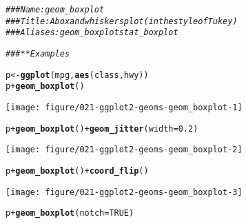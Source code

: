 \documentclass[a4paper,titlepage]{tufte-handout}\usepackage[]{graphicx}\usepackage[]{color}
\makeatletter
\def\maxwidth{ %
  \ifdim\Gin@nat@width>\linewidth
    \linewidth
  \else
    \Gin@nat@width
  \fi
}
\newcommand{\hlnum}[1]{\textcolor[rgb]{0.686,0.059,0.569}{#1}}%
\newcommand{\hlcom}[1]{\textcolor[rgb]{0.678,0.584,0.686}{\textit{#1}}}%
\newcommand{\hlopt}[1]{\textcolor[rgb]{0,0,0}{#1}}%
\newcommand{\hlstd}[1]{\textcolor[rgb]{0.345,0.345,0.345}{#1}}%
\newcommand{\hlkwb}[1]{\textcolor[rgb]{0.69,0.353,0.396}{#1}}%
\newcommand{\hlkwc}[1]{\textcolor[rgb]{0.333,0.667,0.333}{#1}}%
\newcommand{\hlkwd}[1]{\textcolor[rgb]{0.737,0.353,0.396}{\textbf{#1}}}%
\newenvironment{kframe}{%
 \def\at@end@of@kframe{}%
 \ifinner\ifhmode%
  \def\at@end@of@kframe{\end{minipage}}%
  \begin{minipage}{\columnwidth}%
 \fi\fi%
 \def\FrameCommand##1{\hskip\@totalleftmargin \hskip-\fboxsep
 \colorbox{shadecolor}{##1}\hskip-\fboxsep
     \hskip-\linewidth \hskip-\@totalleftmargin \hskip\columnwidth}%
 \MakeFramed {\advance\hsize-\width
   \@totalleftmargin\z@ \linewidth\hsize
   \@setminipage}}%
 {\par\unskip\endMakeFramed%
 \at@end@of@kframe}
\newenvironment{knitrout}{}{} %
\makeatother
\begin{document}
\begin{knitrout}
\color{fgcolor}\begin{kframe}
\begin{alltt}
\hlcom{### Name: geom_boxplot}
\hlcom{### Title: A box and whiskers plot (in the style of Tukey)}
\hlcom{### Aliases: geom_boxplot stat_boxplot}

\hlcom{### ** Examples}

\hlstd{p} \hlkwb{<-} \hlkwd{ggplot}\hlstd{(mpg,} \hlkwd{aes}\hlstd{(class, hwy))}
\hlstd{p} \hlopt{+} \hlkwd{geom_boxplot}\hlstd{()}
\end{alltt}
\end{kframe}
\texttt{[image: figure/021-ggplot2-geoms-geom\_boxplot-1]} 
\begin{kframe}\begin{alltt}
\hlstd{p} \hlopt{+} \hlkwd{geom_boxplot}\hlstd{()} \hlopt{+} \hlkwd{geom_jitter}\hlstd{(}\hlkwc{width} \hlstd{=} \hlnum{0.2}\hlstd{)}
\end{alltt}
\end{kframe}
\texttt{[image: figure/021-ggplot2-geoms-geom\_boxplot-2]} 
\begin{kframe}\begin{alltt}
\hlstd{p} \hlopt{+} \hlkwd{geom_boxplot}\hlstd{()} \hlopt{+} \hlkwd{coord_flip}\hlstd{()}
\end{alltt}
\end{kframe}
\texttt{[image: figure/021-ggplot2-geoms-geom\_boxplot-3]} 
\begin{kframe}\begin{alltt}
\hlstd{p} \hlopt{+} \hlkwd{geom_boxplot}\hlstd{(}\hlkwc{notch} \hlstd{=} \hlnum{TRUE}\hlstd{)}
\end{alltt}



\end{kframe}
\end{knitrout}
\end{document}
